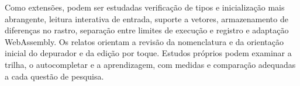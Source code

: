 \documentclass[
    12pt
    ,oneside
    ,a4paper
    ,chapter=TITLE
    ,section=TITLE
    ,sumario=abnt-6027-2012]{abntex2}
\begin{document}
Como extensões, podem ser estudadas verificação de tipos e inicialização mais
abrangente, leitura interativa de entrada, suporte a vetores, armazenamento de
diferenças no rastro, separação entre limites de execução e registro e adaptação
WebAssembly. Os relatos orientam a revisão da nomenclatura e da orientação inicial
do depurador e da edição por toque. Estudos próprios podem examinar a trilha,
o autocompletar e a aprendizagem, com medidas e comparação adequadas a cada
questão de pesquisa.






\end{document}
